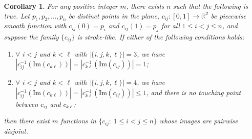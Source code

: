 \documentclass[10pt,a4paper]{amsart}
\newtheorem{corollary}{Corollary}
\begin{document}
\begin{corollary}\label{cor:main0}
    For any positive integer $m$, there exists $n$ such that the following is true. Let $p_1,p_2,\dots,p_n$ be distinct points in the plane, $c_{ij}: [0,1] \to \mathbb{R}^2$ be piecewise smooth function with $c_{ij}(0)=p_i$ and $c_{ij}(1)=p_j$ for all $1\leq i<j \leq n$, and suppose the family $\{c_{ij}\}$ is stroke-like. If either of the following conditions holds: \begin{enumerate}
        \item[(A)] $\forall$ $i<j$ and $k<\ell$ with $|\{i,j,k,\ell\}| = 3$, we have $|c_{ij}^{-1}(\text{Im}(c_{k\ell}))| = |c_{k\ell}^{-1}(\text{Im}(c_{ij}))| = 1$;
        \item[(S)] $\forall$ $i<j$ and $k<\ell$ with $|\{i,j,k,\ell\}| = 4$, we have $|c_{ij}^{-1}(\text{Im}(c_{k\ell}))| = |c_{k\ell}^{-1}(\text{Im}(c_{ij}))| \leq 1$, and there is no touching point between $c_{ij}$ and $c_{k\ell}$;
    \end{enumerate} then there exist $m$ functions in $\{c_{ij}:~1\leq i<j \leq n\}$ whose images are pairwise disjoint.
\end{corollary}
\end{document}

